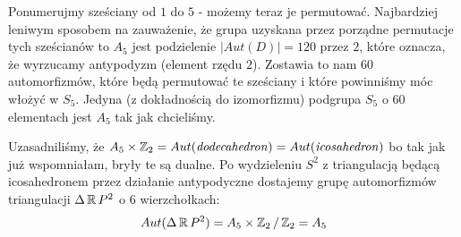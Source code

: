 \documentclass{article}
\begin{document}
Ponumerujmy sześciany od $1$ do $5$ - możemy teraz je permutować. Najbardziej leniwym sposobem na zauważenie, że grupa uzyskana przez porządne permutacje tych sześcianów to $A_5$ jest podzielenie $|Aut(D)|=120$ przez $2$, które oznacza, że wyrzucamy antypodyzm (element rzędu $2$). Zostawia to nam $60$ automorfizmów, które będą permutować te sześciany i które powinniśmy móc włożyć w $S_5$. Jedyna (z dokładnością do izomorfizmu) podgrupa $S_5$ o $60$ elementach jest $A_5$ tak jak chcieliśmy.

Uzasadniliśmy, że $A_5\times\operatorname{\mathbb{Z}}_2=Aut(\text{\emph{dodecahedron}})=Aut(\text{\emph{icosahedron}})$ bo tak jak już wspomniałam, bryły te są dualne. Po wydzieleniu $S^2$ z triangulacją będącą icosahedronem przez działanie antypodyczne dostajemy grupę automorfizmów triangulacji $\Delta \operatorname{\mathbb{R}} P^2$ o $6$ wierzchołkach: 
$$Aut(\Delta\operatorname{\mathbb{R}} P^2)=A_5\times\operatorname{\mathbb{Z}}_2/\operatorname{\mathbb{Z}}_2=A_5$$
\end{document}

